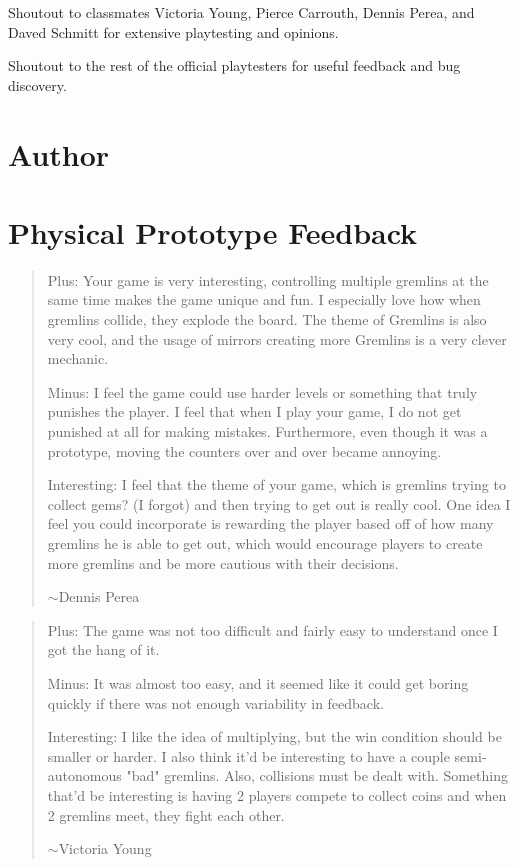 \documentclass{scrreprt}
\newcommand{\newtilde}{$\sim$}
\begin{document}
		Shoutout to classmates Victoria Young, Pierce Carrouth, Dennis Perea, and Daved Schmitt for extensive playtesting and opinions. 
		
		Shoutout to the rest of the official playtesters for useful feedback and bug discovery.
		
	\chapter{Author}
	
	\appendix
	
	\chapter{Physical Prototype Feedback}\label{chp:proto}
		\begin{quote}
			Plus: Your game is very interesting, controlling multiple gremlins at the same time makes the game unique and fun.  I especially love how when gremlins collide, they explode the board.  The theme of Gremlins is also very cool, and the usage of mirrors creating more Gremlins is a very clever mechanic.
			
			Minus: I feel the game could use harder levels or something that truly punishes the player.  I feel that when I play your game, I do not get punished at all for making mistakes. Furthermore, even though it was a prototype, moving the counters over and over became annoying.
			
			Interesting: I feel that the theme of your game, which is gremlins trying to collect gems?  (I forgot) and then trying to get out is really cool.  One idea I feel you could incorporate is rewarding the player based off of how many gremlins he is able to get out, which would encourage players to create more gremlins and be more cautious with their decisions.
			
			\hfill\newtilde Dennis Perea\\
		\end{quote}
		
		\begin{quote}
			Plus: The game was not too difficult and fairly easy to understand once I got the hang of it.
			
			Minus: It was almost too easy, and it seemed like it could get boring quickly if there was not enough variability in feedback.
			
			Interesting: I like the idea of multiplying, but the win condition should be smaller or harder. I also think it'd be interesting to have a couple semi-autonomous "bad" gremlins. Also, collisions must be dealt with. Something that'd be interesting is having 2 players compete to collect coins and when 2 gremlins meet, they fight each other. 
			
			\hfill\newtilde Victoria Young\\
		\end{quote}
		
\end{document}
